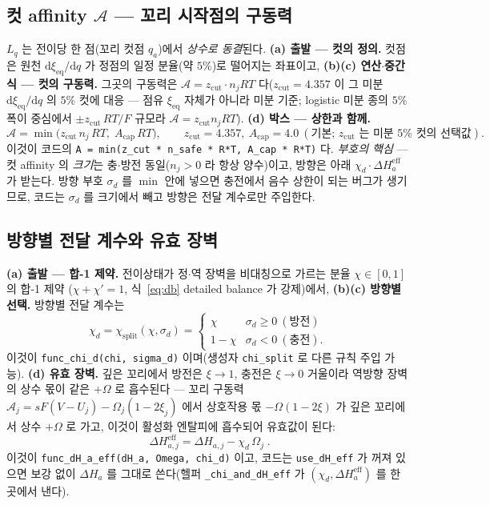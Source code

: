 \documentclass[11pt,a4paper]{article}
\newcommand{\dd}{\mathrm{d}}
\newcommand{\eff}{\mathrm{eff}}
\newcommand{\eq}{\mathrm{eq}}
\newcommand{\code}[1]{\texttt{#1}}
\begin{document}
\subsection{컷 affinity $\mathcal A$ — 꼬리 시작점의 구동력}
$L_q$ 는 전이당 한 점(꼬리 컷점 $q_a$)에서 \emph{상수로 동결}된다. \textbf{(a) 출발 — 컷의 정의.} 컷점은 원천
$\dd\xi_\eq/\dd q$ 가 정점의 일정 분율(약 $5\%$)로 떨어지는 좌표이고, \textbf{(b)(c) 연산$\cdot$중간식 — 컷의 구동력.}
그곳의 구동력은 $\mathcal A=z_\mathrm{cut}\cdot n_jRT$ 다($z_\mathrm{cut}=4.357$ 이 그 미분 $\dd\xi_\eq/\dd q$ 의 $5\%$
컷에 대응 — 점유 $\xi_\eq$ 자체가 아니라 미분 기준; logistic 미분 종의 $5\%$ 폭이 중심에서 $\pm z_\mathrm{cut}\,RT/F$
규모라 $\mathcal A=z_\mathrm{cut}n_jRT$). \textbf{(d) 박스 — 상한과 함께.}
\begin{equation}
\mathcal A=\min\!\big(z_\mathrm{cut}\,n_j\,RT,\;A_\mathrm{cap}\,RT\big),
\qquad z_\mathrm{cut}=4.357,\ A_\mathrm{cap}=4.0\ (\text{기본; }z_\mathrm{cut}\text{ 는 미분 }5\%\text{ 컷의 선택값}).
\label{eq:Acut}
\end{equation}
이것이 코드의 \code{A = min(z\_cut * n\_safe * R*T, A\_cap * R*T)} 다. \emph{부호의 핵심} — 컷 affinity 의 \emph{크기}는
충$\cdot$방전 동일($n_j>0$ 라 항상 양수)이고, 방향은 아래 $\chi_d\cdot\Delta H_a^\eff$ 가 받는다. 방향 부호 $\sigma_d$ 를
$\min$ 안에 넣으면 충전에서 음수 상한이 되는 버그가 생기므로, 코드는 $\sigma_d$ 를 크기에서 빼고 방향은 전달 계수로만
주입한다.

\subsection{방향별 전달 계수와 유효 장벽}
\textbf{(a) 출발 — 합-1 제약.} 전이상태가 정$\cdot$역 장벽을 비대칭으로 가르는 분율 $\chi\in[0,1]$ 의 합-1 제약
($\chi+\chi'=1$, 식~\eqref{eq:db} detailed balance 가 강제)에서, \textbf{(b)(c) 방향별 선택.} 방향별 전달 계수는
\begin{equation}
\chi_d=\chi_\mathrm{split}(\chi,\sigma_d)=
\begin{cases}\chi & \sigma_d\ge0\ (\text{방전})\\ 1-\chi & \sigma_d<0\ (\text{충전}).\end{cases}
\label{eq:chid}
\end{equation}
이것이 \code{func\_chi\_d(chi, sigma\_d)} 이며(생성자 \code{chi\_split} 로 다른 규칙 주입 가능). \textbf{(d) 유효 장벽.}
깊은 꼬리에서 방전은 $\xi\to1$, 충전은 $\xi\to0$ 거울이라 역방향 장벽의 상수 몫이 같은 $+\Omega$ 로 흡수된다 — 꼬리
구동력 $\mathcal A_j=sF(V-U_j)-\Omega_j(1-2\xi_j)$ 에서 상호작용 몫 $-\Omega(1-2\xi)$ 가 깊은 꼬리에서 상수 $+\Omega$ 로
가고, 이것이 활성화 엔탈피에 흡수되어 유효값이 된다:
\begin{equation}
\boxed{\;\Delta H_{a,j}^\eff=\Delta H_{a,j}-\chi_d\,\Omega_j\;.}
\label{eq:dHeff}
\end{equation}
이것이 \code{func\_dH\_a\_eff(dH\_a, Omega, chi\_d)} 이고, 코드는 \code{use\_dH\_eff} 가 꺼져 있으면 보강 없이
$\Delta H_a$ 를 그대로 쓴다(헬퍼 \code{\_chi\_and\_dH\_eff} 가 $(\chi_d,\Delta H_a^\eff)$ 를 한 곳에서 낸다).
\end{document}
